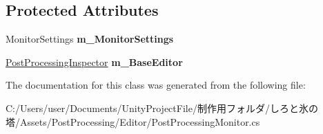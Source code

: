 \subsection*{Protected Attributes}
\begin{DoxyCompactItemize}
\item 
\mbox{\label{class_unity_editor_1_1_post_processing_1_1_post_processing_monitor_aafb8128cac56dbe0e784e1f55f8525a9}} 
Monitor\+Settings {\bfseries m\+\_\+\+Monitor\+Settings}
\item 
\mbox{\label{class_unity_editor_1_1_post_processing_1_1_post_processing_monitor_a2553b93b6efa7231ed205cc06d6495f8}} 
\hyperlink{class_unity_editor_1_1_post_processing_1_1_post_processing_inspector}{Post\+Processing\+Inspector} {\bfseries m\+\_\+\+Base\+Editor}
\end{DoxyCompactItemize}


The documentation for this class was generated from the following file\+:\begin{DoxyCompactItemize}
\item 
C\+:/\+Users/user/\+Documents/\+Unity\+Project\+File/制作用フォルダ/しろと氷の塔/\+Assets/\+Post\+Processing/\+Editor/Post\+Processing\+Monitor.\+cs\end{DoxyCompactItemize}
